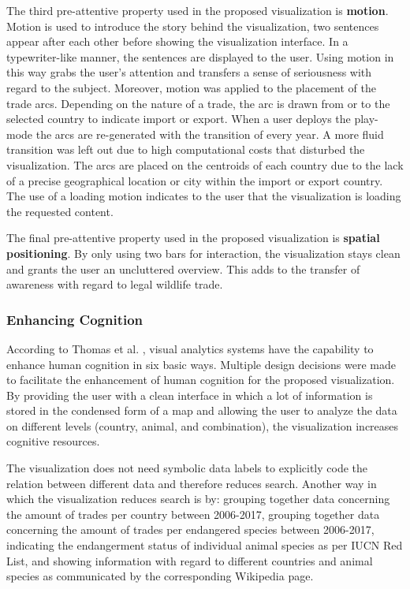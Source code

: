 The third pre-attentive property used in the proposed visualization is \textbf{motion}. Motion is used to introduce the story behind the visualization, two sentences appear after each other before showing the visualization interface. In a typewriter-like manner, the sentences are displayed to the user. Using motion in this way grabs the user's attention and transfers a sense of seriousness with regard to the subject. Moreover, motion was applied to the placement of the trade arcs. Depending on the nature of a trade, the arc is drawn from or to the selected country to indicate import or export. When a user deploys the play-mode the arcs are re-generated with the transition of every year. A more fluid transition was left out due to high computational costs that disturbed the visualization. The arcs are placed on the centroids of each country due to the lack of a precise geographical location or city within the import or export country. The use of a loading motion indicates to the user that the visualization is loading the requested content.

The final pre-attentive property used in the proposed visualization is \textbf{spatial positioning}. By only using two bars for interaction, the visualization stays clean and grants the user an uncluttered overview. This adds to the transfer of awareness with regard to legal wildlife trade. 


\subsubsection{Enhancing Cognition}

According to Thomas et al. \cite{Thomas2005}, visual analytics systems have the capability to enhance human cognition in six basic ways. Multiple design decisions were made to facilitate the enhancement of human cognition for the proposed visualization. 
By providing the user with a clean interface in which a lot of information is stored in the condensed form of a map and allowing the user to analyze the data on different levels (country, animal, and combination), the visualization increases cognitive resources. 

The visualization does not need symbolic data labels to explicitly code the relation between different data and therefore reduces search. Another way in which the visualization reduces search is by: grouping together data concerning the amount of trades per country between 2006-2017, grouping together data concerning the amount of trades per endangered species between 2006-2017, indicating the endangerment status of individual animal species as per IUCN Red List, and showing information with regard to different countries and animal species as communicated by the corresponding Wikipedia page. 

